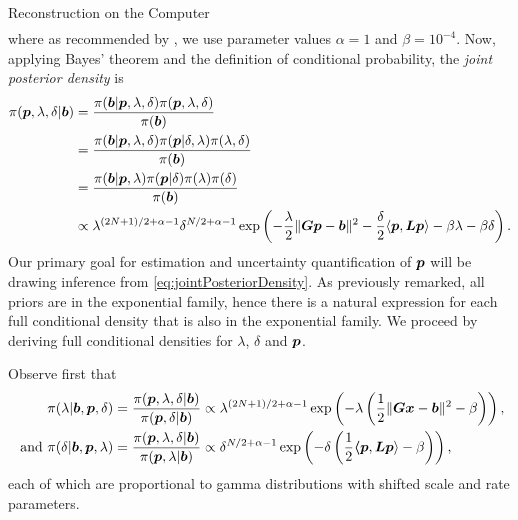 \begin{chapter}{Reconstruction on the Computer}
\begin{align}
\end{align}
where as recommended by \citep{gelman2014bayesian}, we use parameter values $\alpha = 1$ and $\beta =  10^{-4}$. 
Now, applying Bayes' theorem and the definition of conditional probability, the \emph{joint posterior density} is
\begin{align}
\pi(\mbox{\boldmath$p$},\lambda,\delta|\mbox{\boldmath$b$}) 
&= \frac{\pi(\mbox{\boldmath$b$}|\mbox{\boldmath$p$},\lambda,\delta) \pi(\mbox{\boldmath$p$},\lambda,\delta)}{\pi(\mbox{\boldmath$b$})} \nonumber \\
&= \frac{\pi(\mbox{\boldmath$b$}|\mbox{\boldmath$p$},\lambda,\delta) \pi(\mbox{\boldmath$p$}| \delta,\lambda) \pi(\lambda,\delta)}{\pi(\mbox{\boldmath$b$})} \nonumber \\
&= \frac{\pi(\mbox{\boldmath$b$}|\mbox{\boldmath$p$},\lambda) \pi(\mbox{\boldmath$p$}| \delta) \pi(\lambda)\pi(\delta)}{\pi(\mbox{\boldmath$b$})} \nonumber \\
&\propto \lambda^{(2N+1)/2+\alpha-1}\delta^{N/2+\alpha-1} \exp\left(-\frac{\lambda}{2}\|\mbox{\boldmath$Gp$} - \mbox{\boldmath$b$}\|^2 - \frac{\delta}{2}\langle \mbox{\boldmath$p$}, \mbox{\boldmath$L$} \mbox{\boldmath$p$}\rangle - \beta\lambda - \beta\delta \right). \label{eq:jointPosteriorDensity}
\end{align}
Our primary goal for estimation and uncertainty quantification of $\mbox{\boldmath$p$}$ will be drawing inference from \eqref{eq:jointPosteriorDensity}.
As previously remarked, all priors are in the exponential family, hence there is a natural expression for each full conditional density that is also in the exponential family.
We proceed by deriving full conditional densities for $\lambda$, $\delta$ and $\mbox{\boldmath$p$}$.

Observe first that
\begin{align}
  \pi(\lambda| \mbox{\boldmath$b$},\mbox{\boldmath$p$},\delta) 
  &= \frac{\pi(\mbox{\boldmath$p$},\lambda,\delta|\mbox{\boldmath$b$})}{\pi(\mbox{\boldmath$p$},\delta|\mbox{\boldmath$b$}) } 
  \propto \lambda^{(2N+1)/2+\alpha-1}\exp\left(-\lambda\left(\frac{1}{2}\|\mbox{\boldmath$Gx$} - \mbox{\boldmath$b$}\|^2 - \beta\right)  \right), \nonumber\\
\text{ and }\pi(\delta| \mbox{\boldmath$b$},\mbox{\boldmath$p$},\lambda) 
  &= \frac{\pi(\mbox{\boldmath$p$},\lambda,\delta|\mbox{\boldmath$b$})}{\pi(\mbox{\boldmath$p$},\lambda|\mbox{\boldmath$b$}) } 
  \propto \delta^{N/2+\alpha-1}\exp\left(-\delta\left(\frac{1}{2}\mbox{\boldmath$\langle$} \mbox{\boldmath$p$},\mbox{\boldmath$L$}\mbox{\boldmath$p$} \rangle- \beta\right)  \right), \label{eq:lambdaDeltaConditional} 
\end{align}
each of which are proportional to gamma distributions with shifted scale and rate parameters.
 

\end{chapter}
